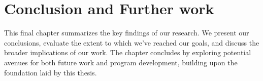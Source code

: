 \chapter{Conclusion and Further work}
\label{chap:conclusion}

This final chapter summarizes the key findings of our research. We present our conclusions, evaluate the extent to which we've reached our goals, and discuss the broader implications of our work. The chapter concludes by exploring potential avenues for both future work and program development, building upon the foundation laid by this thesis.



